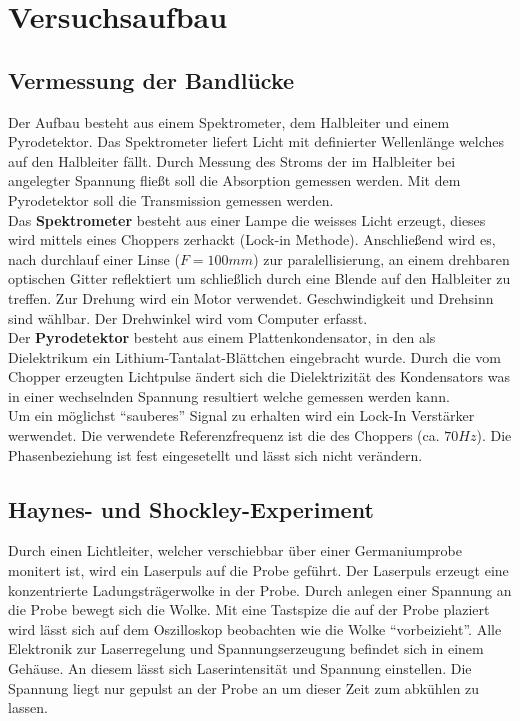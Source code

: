 \documentclass[12pt]{article}
\begin{document}
\section{Versuchsaufbau}
\subsection{Vermessung der Bandlücke}
Der Aufbau besteht aus einem Spektrometer, dem Halbleiter und einem Pyrodetektor.
Das Spektrometer liefert Licht mit definierter Wellenlänge welches auf den Halbleiter fällt. Durch Messung des Stroms der im Halbleiter bei angelegter Spannung fließt soll die Absorption gemessen werden. Mit dem Pyrodetektor soll die Transmission gemessen werden.\\

Das \textbf{Spektrometer} besteht aus einer Lampe die weisses Licht erzeugt, dieses wird mittels eines Choppers zerhackt (Lock-in Methode). Anschließend wird es, nach durchlauf einer Linse ($F = 100mm$) zur paralellisierung, an einem drehbaren optischen Gitter reflektiert um schließlich durch eine Blende auf den Halbleiter zu treffen. Zur Drehung wird ein Motor verwendet. Geschwindigkeit und Drehsinn sind wählbar. Der Drehwinkel wird vom Computer erfasst.\\

Der \textbf{Pyrodetektor} besteht aus einem Plattenkondensator, in den als Dielektrikum ein Lithium-Tantalat-Blättchen eingebracht wurde. Durch die vom Chopper erzeugten Lichtpulse ändert sich die Dielektrizität des Kondensators was in einer wechselnden Spannung resultiert welche gemessen werden kann.\\

Um ein möglichst "`sauberes"' Signal zu erhalten wird ein Lock-In Verstärker werwendet.
Die verwendete Referenzfrequenz ist die des Choppers (ca. $70Hz$). Die Phasenbeziehung ist fest eingesetellt und lässt sich nicht verändern.

\subsection{Haynes- und Shockley-Experiment}
Durch einen Lichtleiter, welcher verschiebbar über einer Germaniumprobe monitert ist, wird ein Laserpuls auf die Probe geführt.
Der Laserpuls erzeugt eine konzentrierte Ladungsträgerwolke in der Probe. Durch anlegen einer Spannung an die Probe bewegt sich die Wolke. Mit eine Tastspize die auf der Probe plaziert wird lässt sich auf dem Oszilloskop beobachten wie die Wolke "`vorbeizieht"'. Alle Elektronik zur Laserregelung und Spannungserzeugung befindet sich in einem Gehäuse. An diesem lässt sich Laserintensität und Spannung einstellen. Die Spannung liegt nur gepulst an der Probe an um dieser Zeit zum abkühlen zu lassen.\\
\end{document}
